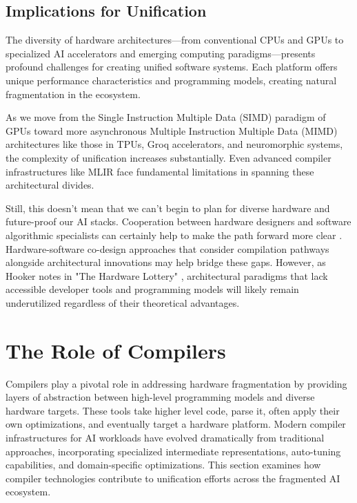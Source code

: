\documentclass[manuscript,screen,review,format=acmsmall]{acmart}
\begin{document}
\subsection{Implications for Unification}

The diversity of hardware architectures—from conventional CPUs and GPUs to specialized AI accelerators and emerging computing paradigms—presents profound challenges for creating unified software systems. Each platform offers unique performance characteristics and programming models, creating natural fragmentation in the ecosystem.

As we move from the Single Instruction Multiple Data (SIMD) paradigm of GPUs toward more asynchronous Multiple Instruction Multiple Data (MIMD) architectures like those in TPUs, Groq accelerators, and neuromorphic systems, the complexity of unification increases substantially. Even advanced compiler infrastructures like MLIR face fundamental limitations in spanning these architectural divides.

Still, this doesn’t mean that we can’t begin to plan for diverse hardware and future-proof our AI stacks. Cooperation between hardware designers and software algorithmic specialists can certainly help to make the path forward more clear \cite{ZhangHongbin2023CTiD}. Hardware-software co-design approaches that consider compilation pathways alongside architectural innovations may help bridge these gaps. However, as Hooker notes in "The Hardware Lottery" \cite{TheHardwareLottery}, architectural paradigms that lack accessible developer tools and programming models will likely remain underutilized regardless of their theoretical advantages.

\section{The Role of Compilers}

Compilers play a pivotal role in addressing hardware fragmentation by providing layers of abstraction between high-level programming models and diverse hardware targets. These tools take higher level code, parse it, often apply their own optimizations, and eventually target a hardware platform. Modern compiler infrastructures for AI workloads have evolved dramatically from traditional approaches, incorporating specialized intermediate representations, auto-tuning capabilities, and domain-specific optimizations. This section examines how compiler technologies contribute to unification efforts across the fragmented AI ecosystem.
\end{document}
